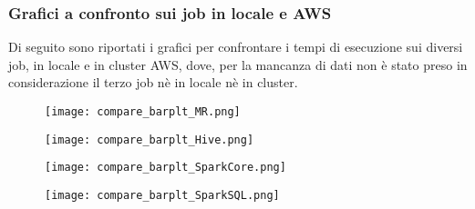 \subsubsection{Grafici a confronto sui job in locale e AWS}
Di seguito sono riportati i grafici per confrontare i tempi di esecuzione sui diversi job, in locale e in cluster AWS, dove, per la mancanza di dati non è stato preso in considerazione il terzo job nè in locale nè in cluster.
\begin{figure}[!ht]
    \centering
    \texttt{[image: compare\_barplt\_MR.png]}
\end{figure}

\begin{figure}[!ht]
    \centering
    \texttt{[image: compare\_barplt\_Hive.png]}
\end{figure}
\newpage
\begin{figure}[!ht]
    \centering
    \texttt{[image: compare\_barplt\_SparkCore.png]}
\end{figure}

\begin{figure}[!ht]
    \centering
    \texttt{[image: compare\_barplt\_SparkSQL.png]}
\end{figure}
\newpage

